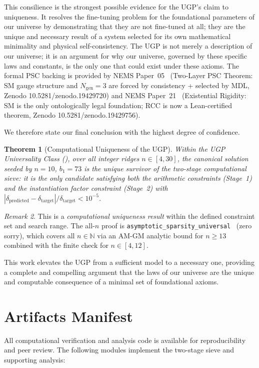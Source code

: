 \documentclass[11pt,twocolumn]{article}
\newtheorem{theorem}{Theorem}[section]
\theoremstyle{remark}
\newtheorem{remark}[theorem]{Remark}
\begin{document}
This consilience is the strongest possible evidence for the UGP's claim to uniqueness. It resolves the fine-tuning problem for the foundational parameters of our universe by demonstrating that they are not fine-tuned at all; they are the unique and necessary result of a system selected for its own mathematical minimality and physical self-consistency. The UGP is not merely a description of our universe; it is an argument for why our universe, governed by these specific laws and constants, is the only one that could exist under these axioms.
The formal PSC backing is provided by NEMS Paper~05~\cite{SpivackPSCOpt} (Two-Layer PSC Theorem: SM gauge structure and $N_{\text{gen}}=3$ are forced by consistency + selected by MDL, Zenodo 10.5281/zenodo.19429720) and NEMS Paper~21~\cite{SpivackExistentialRigidity} (Existential Rigidity: SM is the only ontologically legal foundation; RCC is now a Lean-certified theorem, Zenodo 10.5281/zenodo.19429756).

We therefore state our final conclusion with the highest degree of confidence.

\begin{theorem}[Computational Uniqueness of the UGP]
Within the UGP Universality Class (), over all integer ridges $n \in [4,30]$, the canonical solution seeded by $n=10$, $b_1=73$ is the unique survivor of the two-stage computational sieve: it is the only candidate satisfying both the arithmetic constraints (Stage~1) and the instantiation factor constraint (Stage~2) with $|\delta_{\text{predicted}} - \delta_{\text{target}}| / \delta_{\text{target}} < 10^{-5}$.
\end{theorem}
\begin{remark}
This is a \emph{computational uniqueness result} within the defined constraint set and search range. The all-$n$ proof is \texttt{asymptotic\_sparsity\_universal}~\cite{Spivack2026_Uniqueness25} (zero sorry), which covers all $n\in\mathbb{N}$ via an AM-GM analytic bound for $n\ge 13$ combined with the finite check for $n\in[4,12]$.
\end{remark}

This work elevates the UGP from a sufficient model to a necessary one, providing a complete and compelling argument that the laws of our universe are the unique and computable consequence of a minimal set of foundational axioms.


\section*{Artifacts Manifest}
All computational verification and analysis code is available for reproducibility and peer review. The following modules implement the two-stage sieve and supporting analysis:
\end{document}
